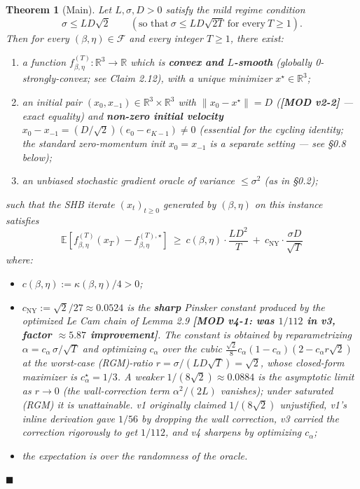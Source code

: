 \documentclass[11pt,a4paper]{article}
\theoremstyle{plain}
\newtheorem{theorem}{Theorem}[section]
\theoremstyle{definition}
\theoremstyle{remark}
\newcommand{\R}{\mathbb{R}}
\newcommand{\E}{\mathbb{E}}
\newcommand{\F}{\mathcal{F}}
\begin{document}
\begin{theorem}[Main]
Let $L, \sigma, D > 0$ satisfy the mild regime condition
\begin{equation}
\sigma \leq L D\sqrt 2 \qquad (\text{so that}\ \sigma \leq L D\sqrt{2T}\ \text{for every}\ T \geq 1).\tag{RGM}\label{eq:RGM}
\end{equation}
Then for every $(\beta, \eta) \in \F$ and every integer $T \geq 1$, there exist:

\begin{enumerate}[label=(\arabic*)]
\item a function $f_{\beta,\eta}^{(T)} : \R^3 \to \R$ which is \textbf{convex and $L$-smooth} (globally 0-strongly-convex; see Claim 2.12), with a unique minimizer $x^\star \in \R^3$;
\item an initial pair $(x_0, x_{-1}) \in \R^3 \times \R^3$ with $\|x_0 - x^\star\| = D$ (\textbf{[MOD v2-2]} --- exact equality) and \textbf{non-zero initial velocity} $x_0 - x_{-1} = (D/\sqrt 2)(e_0 - e_{K-1}) \neq 0$ (essential for the cycling identity; the standard zero-momentum init $x_0 = x_{-1}$ is a separate setting --- see \S0.8 below);
\item an unbiased stochastic gradient oracle of variance $\leq \sigma^2$ (as in \S0.2);
\end{enumerate}

such that the SHB iterate $(x_t)_{t\geq 0}$ generated by $(\beta,\eta)$ on this instance satisfies
\begin{equation}
\boxed{\ \E[f_{\beta,\eta}^{(T)}(x_T) - f_{\beta,\eta}^{(T),\star}] \ \geq\ c(\beta,\eta) \cdot \frac{L D^2}{T}\ +\ c_\mathrm{NY} \cdot \frac{\sigma D}{\sqrt T}\ }\tag{MAIN}\label{eq:MAIN}
\end{equation}
where:
\begin{itemize}
\item $c(\beta,\eta) := \kappa(\beta,\eta) / 4 > 0$;
\item $c_\mathrm{NY} := \sqrt 2/27 \approx 0.0524$ is the \textbf{sharp} Pinsker constant produced by the optimized Le Cam chain of Lemma 2.9 \textbf{[MOD v4-1: was $1/112$ in v3, factor $\approx 5.87$ improvement]}. The constant is obtained by reparametrizing $\alpha = c_\alpha\,\sigma/\sqrt T$ and optimizing $c_\alpha$ over the cubic $\frac{\sqrt 2}{8}c_\alpha(1-c_\alpha)(2 - c_\alpha r\sqrt 2)$ at the worst-case (RGM)-ratio $r = \sigma/(LD\sqrt T) = \sqrt 2$, whose closed-form maximizer is $c_\alpha^\star = 1/3$. A weaker $1/(8\sqrt 2) \approx 0.0884$ is the asymptotic limit as $r \to 0$ (the wall-correction term $\alpha^2/(2L)$ vanishes); under saturated (RGM) it is unattainable. v1 originally claimed $1/(8\sqrt 2)$ unjustified, v1's inline derivation gave $1/56$ by dropping the wall correction, v3 carried the correction rigorously to get $1/112$, and v4 sharpens by optimizing $c_\alpha$;
\item the expectation is over the randomness of the oracle.
\end{itemize}
\hfill$\blacksquare$
\end{theorem}
\end{document}
